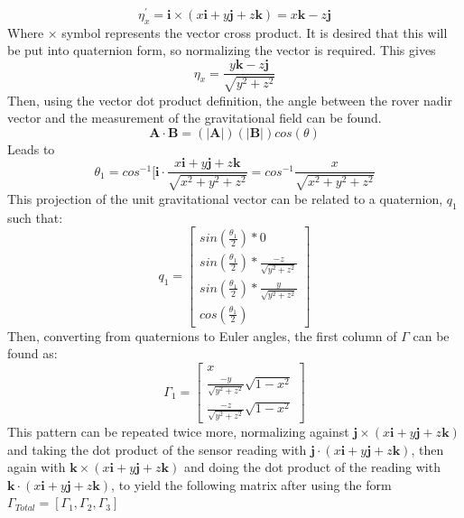 \documentclass[12pt,a4paper]{book}
\begin{document}
\begin{equation}
\eta^{'}_{x} = \mathbf{i} \times (x\mathbf{i} + y\mathbf{j} + z\mathbf{k}) = x\mathbf{k} - z\mathbf{j}
\end{equation}
Where $\times$ symbol represents the vector cross product. It is desired that this will be put into quaternion form, so normalizing the vector is required.  This gives
\begin{equation}
\eta_{x} = \frac{y\mathbf{k} - z\mathbf{j}}{\sqrt{y^{2}+z^{2}}}
\end{equation}
Then, using the vector dot product definition, the angle between the rover nadir vector and the measurement of the gravitational field can be found.
\begin{equation}
\mathbf{A}\cdot \mathbf{B} = (|\mathbf{A}|)(|\mathbf{B}|)cos(\theta)
\end{equation}
Leads to
\begin{equation}
\theta_{1} = cos^{-1}[\mathbf{i}\cdot \frac{x\mathbf{i}+y\mathbf{j}+z\mathbf{k}}{\sqrt{x^2 + y^2 + z^2}} = cos^{-1}\frac{x}{\sqrt{x^2 + y^2 + z^2}}
\end{equation}
This projection of the unit gravitational vector can be related to a quaternion, $q_{1}$ such that:
\begin{equation}
q_{1} = \begin{bmatrix}
sin(\frac{\theta_{1}}{2}) * 0\\
sin(\frac{\theta_{1}}{2}) * \frac{-z}{\sqrt{y^{2} + z^{2}}}\\
sin(\frac{\theta_{1}}{2}) * \frac{y}{\sqrt{y^{2} + z^{2}}}\\
cos(\frac{\theta_{1}}{2})
\end{bmatrix}
\end{equation}
Then, converting from quaternions to Euler angles, the first column of $\Gamma$ can be found as:
\begin{equation}
\Gamma_{1} = \begin{bmatrix}
x\\
\frac{-y}{\sqrt{y^{2} + z^{2}}}\sqrt{1-x^{2}}\\
\frac{-z}{\sqrt{y^{2} + z^{2}}}\sqrt{1-x^{2}}
\end{bmatrix}
\end{equation}
This pattern can be repeated twice more, normalizing against $\mathbf{j} \times (x\mathbf{i} + y\mathbf{j} + z\mathbf{k})$ and taking the dot product of the sensor reading with $\mathbf{j} \cdot (x\mathbf{i} + y\mathbf{j} + z\mathbf{k})$, then again with $\mathbf{k} \times ( x\mathbf{i} + y\mathbf{j} + z\mathbf{k})$ and doing the dot product of the reading with $\mathbf{k} \cdot (x\mathbf{i} + y\mathbf{j} + z\mathbf{k})$, to yield the following matrix after using the form $\Gamma_{Total} = [\Gamma_{1}, \Gamma_{2}, \Gamma_{3}]$
\end{document}
